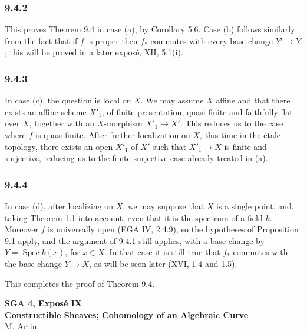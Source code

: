 \documentclass[11pt]{article}
\newcommand{\Spec}{\operatorname{Spec}}
\newcommand{\EGA}{EGA}
\begin{document}
\subsubsection*{9.4.2}
This proves Theorem 9.4 in case (a), by Corollary 5.6. Case (b) follows similarly from the fact that if \(f\) is proper then \(f_*\) commutes with every base change \(Y'\to Y\); this will be proved in a later expos\'e, XII, 5.1(i).

\subsubsection*{9.4.3}
In case (c), the question is local on \(X\). We may assume \(X\) affine and that there exists an affine scheme \(X'_1\), of finite presentation, quasi-finite and faithfully flat over \(X\), together with an \(X\)-morphism \(X'_1\to X'\). This reduces us to the case where \(f\) is quasi-finite. After further localization on \(X\), this time in the \'etale topology, there exists an open \(X'_1\) of \(X'\) such that \(X'_1\to X\) is finite and surjective, reducing us to the finite surjective case already treated in (a).

\subsubsection*{9.4.4}
In case (d), after localizing on \(X\), we may suppose that \(X\) is a single point, and, taking Theorem 1.1 into account, even that it is the spectrum of a field \(k\). Moreover \(f\) is universally open (\EGA{} IV, 2.4.9), so the hypotheses of Proposition 9.1 apply, and the argument of 9.4.1 still applies, with a base change by \(Y=\Spec k(x)\), for \(x\in X\). In that case it is still true that \(f_*\) commutes with the base change \(Y\to X\), as will be seen later (XVI, 1.4 and 1.5).

This completes the proof of Theorem 9.4.


\begin{center}
{\Large \textbf{SGA 4, Expos\'e IX}}\\[0.35em]
{\large \textbf{Constructible Sheaves; Cohomology of an Algebraic Curve}}\\[0.25em]
{\normalsize M. Artin}
\end{center}
\end{document}
